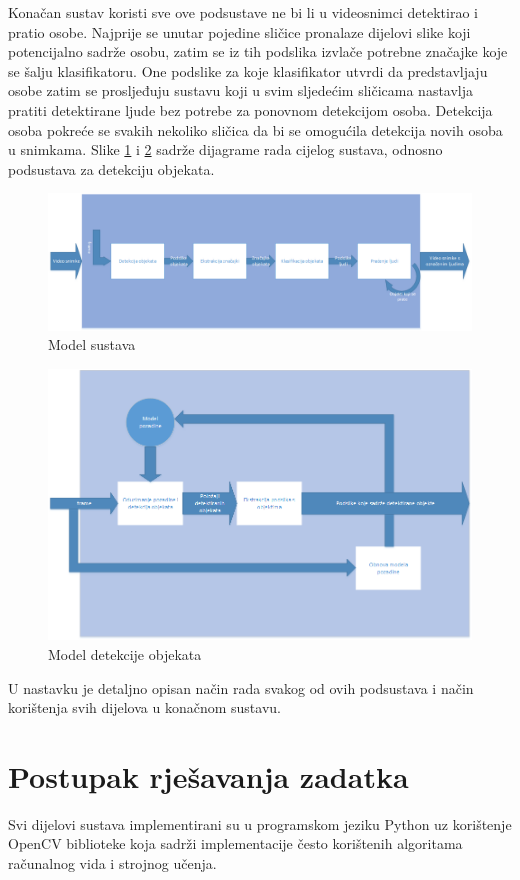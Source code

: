 \documentclass[times, utf8, seminar, numeric]{fer}
\begin{document}
Konačan sustav koristi sve ove podsustave ne bi li u videosnimci detektirao i pratio osobe. Najprije se unutar pojedine sličice  pronalaze dijelovi slike koji potencijalno sadrže osobu, zatim se iz tih podslika izvlače potrebne značajke koje se šalju klasifikatoru. One podslike za koje klasifikator utvrdi da predstavljaju osobe zatim se prosljeđuju sustavu koji u svim sljedećim sličicama nastavlja pratiti detektirane ljude bez potrebe za ponovnom detekcijom osoba. Detekcija osoba pokreće se svakih nekoliko sličica da bi se omogućila detekcija novih osoba u snimkama. Slike \ref{sustav} i \ref{pozadina} sadrže dijagrame rada cijelog sustava, odnosno podsustava za detekciju objekata.
\begin{figure}
\centering
\includegraphics[width=1.1\textwidth]{sustav.png}
\caption{Model sustava}
\label{sustav}
\end{figure}
\begin{figure}
\centering
\includegraphics[width=1\textwidth]{pozadina.png}
\caption{Model detekcije objekata}
\label{pozadina}
\end{figure}
U nastavku je detaljno opisan način rada svakog od ovih podsustava i način korištenja svih dijelova u konačnom sustavu.
\chapter{Postupak rješavanja zadatka}
Svi dijelovi sustava implementirani su u programskom jeziku Python uz korištenje OpenCV biblioteke koja sadrži implementacije često korištenih algoritama računalnog vida i strojnog učenja.
\end{document}
